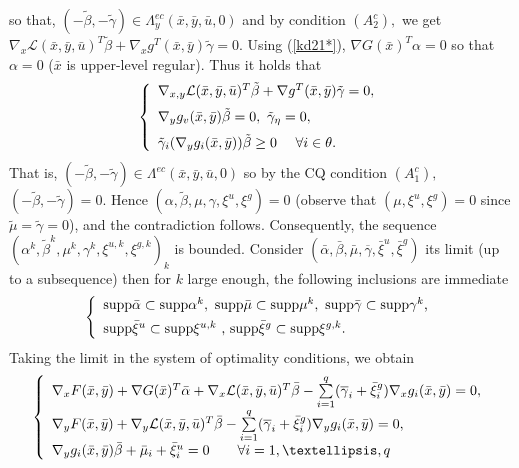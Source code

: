 	so that, $(-\tilde{\beta},-\tilde{\gamma})\in\Lambda_{y}^{ec}(\bar{x},\bar
	{y},\bar{u},0)$ and by condition $(A_{2}^{c}),$ we get
	$
	\nabla_{x}\mathcal{L}(\bar{x},\bar{y},\bar{u})^{T}\tilde{\beta}+\nabla
	_{x}g^{T}(\bar{x},\bar{y})\tilde{\gamma}=0.
	$
	Using (\ref{kd21*}), $\nabla G(\bar{x})^{T}\alpha=0$ so that
	$\alpha=0$ ($\bar{x}$ is upper-level regular). Thus it holds that
	\[
	\left\{
	\begin{array}
	[c]{l}%
	\nabla_{x,y}\mathcal{L}(\bar{x},\bar{y},\bar{u})^{T}\tilde{\beta}+\nabla
	g^{T}(\bar{x},\bar{y})\tilde{\gamma}=0,\medskip\\
	\nabla_{y}g_{v}(\bar{x},\bar{y})\tilde{\beta}=0,\text{ }\tilde{\gamma}_{\eta
	}=0,\medskip\\
	\tilde{\gamma}_{i}(\nabla_{y}g_{i}(\bar{x},\bar{y}))\tilde{\beta}\geq0\text{
		\ \ \ }\forall i\in\theta.
	\end{array}
	\right.
	\]
	That is, $(-\tilde{\beta},-\tilde{\gamma})\in\Lambda^{ec}(\bar{x},\bar{y}
	,\bar{u},0)$ so by the CQ condition $(A_{1}^{c}),$ $(-\tilde{\beta}
	,-\tilde{\gamma})=0.$ Hence $(\alpha,\tilde{\beta},\mu,\gamma,\xi^{u},\xi
	^{g})=0$ (observe that $(\mu,\xi^{u},\xi^{g})=0$ since $\tilde{\mu}
	=\tilde{\gamma}=0$), and the contradiction follows. Consequently, the sequence
	$(\alpha^{k},\tilde{\beta}^{k},\mu^{k},\gamma^{k},\xi^{u,k},\xi^{g,k})_{k}$ is
	bounded. Consider $(\bar{\alpha},\bar{\beta},\bar{\mu},\overline{\gamma}%
	,\bar{\xi}^{u},\bar{\xi}^{g})$ its limit (up to a subsequence) then for $k$
	large enough, the following inclusions are immediate
	\begin{equation}
	\left\{
	\begin{array}
	[c]{l}
	\mathrm{supp}\bar{\alpha}\subset\mathrm{supp}\alpha^{k},\text{ }
	\mathrm{supp}\bar{\mu}\subset\mathrm{supp}\mu^{k},\text{ }\mathrm{supp}
	\bar{\gamma}\subset\mathrm{supp}\gamma^{k}\text{,\medskip\medskip} \\[1ex]
	\mathrm{supp}\bar{\xi}^{u}\subset\mathrm{supp}\xi^{u,k}\text{ , }
	\mathrm{supp}\bar{\xi}^{g}\subset\mathrm{supp}\xi^{g,k}.
	\end{array}
	\right. \label{sup}
	\end{equation}
	Taking the limit in the system of optimality conditions, we obtain%
	\begin{equation}
	\left\{
	\begin{array}
	[c]{l}
	\nabla_{x}F(\bar{x},\bar{y})+\nabla G(\bar{x})^{T}\bar{\alpha}+\nabla
	_{x}\mathcal{L}(\bar{x},\bar{y},\bar{u})^{T}\bar{\beta}-\sum\limits_{i=1}
	^{q}(\overline{\gamma}_{i}+\bar{\xi}_{i}^{g})\nabla_{x}g_{i}(\bar{x},\bar
	{y})=0,\\[1ex]
	\nabla_{y}F(\bar{x},\bar{y})+\nabla_{y}\mathcal{L}(\bar{x},\bar{y},\bar
	{u})^{T}\bar{\beta}-\sum\limits_{i=1}^{q}(\overline{\gamma}_{i}+\bar{\xi}
	_{i}^{g})\nabla_{y}g_{i}(\bar{x},\bar{y})=0,\\[1ex]
	\nabla_{y}g_{i}(\bar{x},\bar{y})\bar{\beta}+\bar{\mu}_{i}+\bar{\xi}_{i}
	^{u}=0\text{ \ \ \ \ \ }\forall i=1,\ldots,q
	\end{array}
	\right. \label{kd25}
	\end{equation}

